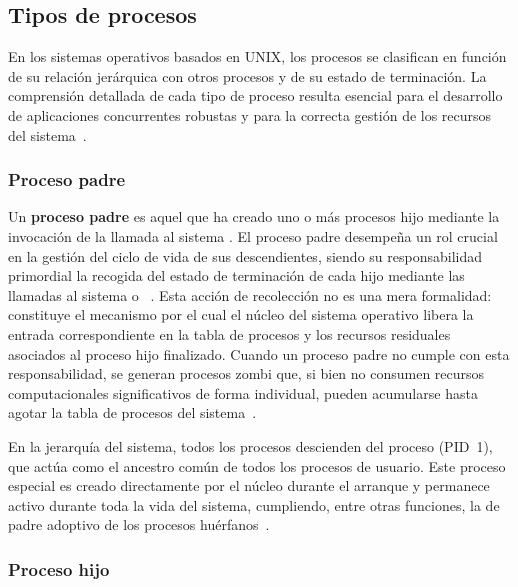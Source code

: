 \subsection{Tipos de procesos}
\label{subsec:tipos_procesos}

En los sistemas operativos basados en UNIX, los procesos se clasifican en función de su relación jerárquica con otros procesos y de su estado de terminación. La comprensión detallada de cada tipo de proceso resulta esencial para el desarrollo de aplicaciones concurrentes robustas y para la correcta gestión de los recursos del sistema~\cite{stevens2013, love2013}.

\subsubsection{Proceso padre}
\label{subsubsec:proceso_padre}

Un \textbf{proceso padre} es aquel que ha creado uno o más procesos hijo mediante la invocación de la llamada al sistema . El proceso padre desempeña un rol crucial en la gestión del ciclo de vida de sus descendientes, siendo su responsabilidad primordial la recogida del estado de terminación de cada hijo mediante las llamadas al sistema  o ~\cite{silberschatz2018}. Esta acción de recolección no es una mera formalidad: constituye el mecanismo por el cual el núcleo del sistema operativo libera la entrada correspondiente en la tabla de procesos y los recursos residuales asociados al proceso hijo finalizado. Cuando un proceso padre no cumple con esta responsabilidad, se generan procesos zombi que, si bien no consumen recursos computacionales significativos de forma individual, pueden acumularse hasta agotar la tabla de procesos del sistema~\cite{love2013}.

En la jerarquía del sistema, todos los procesos descienden del proceso  (PID~1), que actúa como el ancestro común de todos los procesos de usuario. Este proceso especial es creado directamente por el núcleo durante el arranque y permanece activo durante toda la vida del sistema, cumpliendo, entre otras funciones, la de padre adoptivo de los procesos huérfanos~\cite{tanenbaum2015}.

\subsubsection{Proceso hijo}
\label{subsubsec:proceso_hijo}

